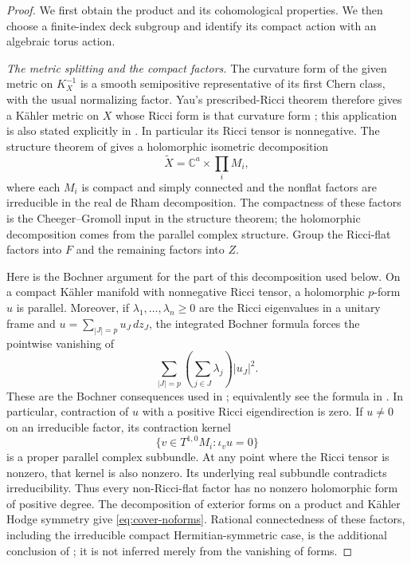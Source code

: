 \begin{proof}
We first obtain the product and its cohomological properties.  We then
choose a finite-index deck subgroup and identify its compact action
with an algebraic torus action.

\smallskip\noindent
\emph{The metric splitting and the compact factors.}
The curvature form of the given metric on $K_X^{-1}$ is a smooth
semipositive representative of its first Chern class, with the usual
normalizing factor.  Yau's prescribed-Ricci theorem therefore gives a
K\"ahler metric on $X$ whose Ricci form is that curvature form
\cite{Yau1978}; this application is also stated explicitly in
\cite[p.~218]{DPS1996}.  In particular its Ricci tensor is nonnegative.
The structure theorem of \cite{DPS1996} gives a holomorphic isometric
decomposition
\[
          \widetilde X=\mathbb C^a\times\prod_i M_i,
\]
where each $M_i$ is compact and simply connected and the nonflat
factors are irreducible in the real de Rham decomposition.  The
compactness of these factors is the Cheeger--Gromoll input in the
structure theorem; the holomorphic decomposition comes from the
parallel complex structure.  Group the Ricci-flat factors into $F$
and the remaining factors into $Z$.

Here is the Bochner argument for the part of this decomposition used
below.  On a compact K\"ahler manifold with nonnegative Ricci tensor,
a holomorphic $p$-form $u$ is parallel.  Moreover, if
$\lambda_1,\ldots,\lambda_n\geq0$ are the Ricci eigenvalues in a
unitary frame and $u=\sum_{|J|=p}u_J\,dz_J$, the integrated Bochner
formula forces the pointwise vanishing of
\[
             \sum_{|J|=p}\left(\sum_{j\in J}\lambda_j\right)|u_J|^2.
\]
These are the Bochner consequences used in
\cite[\S2]{DPS1996}; equivalently see the formula in
\cite[(1.6)]{CDP2015}.  In particular, contraction of $u$ with a
positive Ricci eigendirection is zero.  If $u\ne0$ on an irreducible
factor, its contraction kernel
\[
             \{v\in T^{1,0}M_i:\iota_vu=0\}
\]
is a proper parallel complex subbundle.  At any point where the Ricci
tensor is nonzero, that kernel is also nonzero.  Its underlying real
subbundle contradicts irreducibility.  Thus every non-Ricci-flat
factor has no nonzero holomorphic form of positive degree.  The
decomposition of exterior forms on a product and K\"ahler Hodge
symmetry give \eqref{eq:cover-noforms}.  Rational connectedness of
these factors, including the irreducible compact Hermitian-symmetric
case, is the additional conclusion of
\cite[Theorem~1.4(a) and \S4]{CDP2015}; it is not inferred merely from
the vanishing of forms.


\end{proof}
